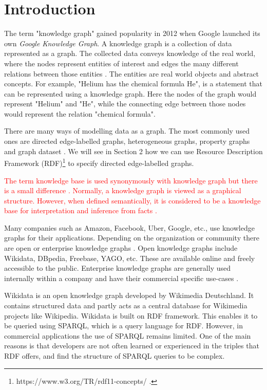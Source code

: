 \chapter{Introduction}

The term "knowledge graph" gained popularity in 2012 when Google launched its own \textit{Google Knowledge Graph}. A knowledge graph is a collection of data represented as a graph. The collected data conveys knowledge of the real world, where the nodes represent entities of interest and edges the many different relations between those entities \cite{Hogan2021}. The entities are real world objects and abstract concepts. For example, "Helium has the chemical formula He", is a statement that can be represented using a knowledge graph. Here the nodes of the graph would represent "Helium" and "He", while the connecting edge between those nodes would represent the relation "chemical formula". 

There are many ways of modelling data as a graph. The most commonly used ones are directed edge-labelled graphs, heterogeneous graphs, property graphs and graph dataset \cite{Hogan2021}. We will see in Section 2 how we can use Resource Description Framework (RDF)\footnote{https://www.w3.org/TR/rdf11-concepts/ .} to specify directed edge-labelled graphs.

\textcolor{red}{The term knowledge base is used synonymously with knowledge graph but there is a small difference \cite{Ji2022}. Normally, a knowledge graph is viewed as a graphical structure. However, when defined semantically, it is considered to be a knowledge base for interpretation and inference from facts \cite{Bordes2011}.}

Many companies such as Amazon, Facebook, Uber, Google, etc., use knowledge graphs for their applications. Depending on the organization or community there are open or enterprise knowledge graphs \cite{Hogan2021}. Open knowledge graphs include Wikidata, DBpedia, Freebase, YAGO, etc. These are available online and freely accessible to the public. Enterprise knowledge graphs are generally used internally within a company and have their commercial specific use-cases \cite{Hogan2021}.

Wikidata is an open knowledge graph developed by Wikimedia Deutschland. It contains structured data and partly acts as a central database for Wikimedia projects like Wikipedia. Wikidata is built on RDF framework. This enables it to be queried using SPARQL, which is a query language for RDF. However, in commercial applications the use of SPARQL remains limited. One of the main reasons is that developers are not often learned or experienced in the triples that RDF offers, and find the structure of SPARQL queries to be complex.  

